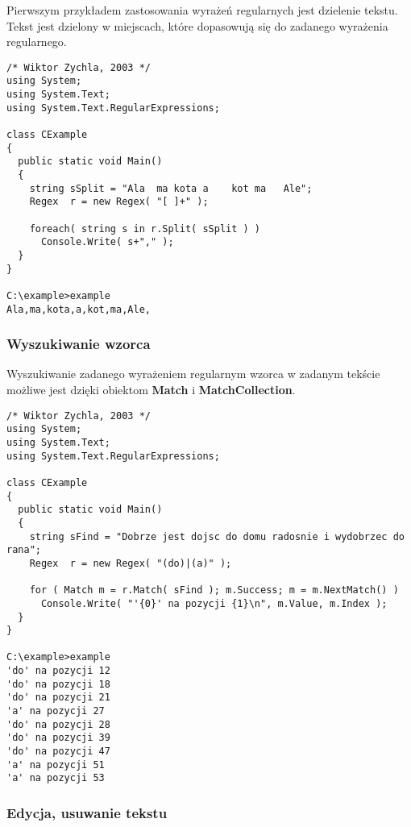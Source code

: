 Pierwszym przykładem zastosowania wyrażeń regularnych jest dzielenie tekstu. Tekst jest dzielony
w miejscach, które dopasowują się do zadanego wyrażenia regularnego.

\begin{scriptsize}
\begin{verbatim}
/* Wiktor Zychla, 2003 */
using System;
using System.Text;
using System.Text.RegularExpressions;

class CExample 
{
  public static void Main()
  {
    string sSplit = "Ala  ma kota a    kot ma   Ale";
    Regex  r = new Regex( "[ ]+" );

    foreach( string s in r.Split( sSplit ) )
      Console.Write( s+"," );
  }  
}

C:\example>example
Ala,ma,kota,a,kot,ma,Ale,
\end{verbatim}
\end{scriptsize}

\subsubsection{Wyszukiwanie wzorca}

Wyszukiwanie zadanego wyrażeniem regularnym wzorca w zadanym tekście możliwe jest dzięki
obiektom {\bf Match} i {\bf MatchCollection}.

\begin{scriptsize}
\begin{verbatim}
/* Wiktor Zychla, 2003 */
using System;
using System.Text;
using System.Text.RegularExpressions;

class CExample 
{
  public static void Main()
  {
    string sFind = "Dobrze jest dojsc do domu radosnie i wydobrzec do rana";
    Regex  r = new Regex( "(do)|(a)" );

    for ( Match m = r.Match( sFind ); m.Success; m = m.NextMatch() )
      Console.Write( "'{0}' na pozycji {1}\n", m.Value, m.Index );
  }  
}

C:\example>example
'do' na pozycji 12
'do' na pozycji 18
'do' na pozycji 21
'a' na pozycji 27
'do' na pozycji 28
'do' na pozycji 39
'do' na pozycji 47
'a' na pozycji 51
'a' na pozycji 53
\end{verbatim}
\end{scriptsize}

\subsubsection{Edycja, usuwanie tekstu}

